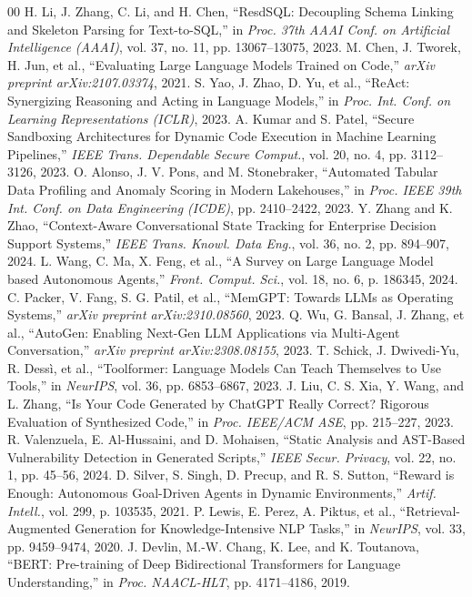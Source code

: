 \documentclass[conference]{IEEEtran}
\begin{document}
\begin{thebibliography}{00}
 H. Li, J. Zhang, C. Li, and H. Chen, ``ResdSQL: Decoupling Schema Linking and Skeleton Parsing for Text-to-SQL,'' in \textit{Proc. 37th AAAI Conf. on Artificial Intelligence (AAAI)}, vol. 37, no. 11, pp. 13067--13075, 2023.
 M. Chen, J. Tworek, H. Jun, et al., ``Evaluating Large Language Models Trained on Code,'' \textit{arXiv preprint arXiv:2107.03374}, 2021.
 S. Yao, J. Zhao, D. Yu, et al., ``ReAct: Synergizing Reasoning and Acting in Language Models,'' in \textit{Proc. Int. Conf. on Learning Representations (ICLR)}, 2023.
 A. Kumar and S. Patel, ``Secure Sandboxing Architectures for Dynamic Code Execution in Machine Learning Pipelines,'' \textit{IEEE Trans. Dependable Secure Comput.}, vol. 20, no. 4, pp. 3112--3126, 2023.
 O. Alonso, J. V. Pons, and M. Stonebraker, ``Automated Tabular Data Profiling and Anomaly Scoring in Modern Lakehouses,'' in \textit{Proc. IEEE 39th Int. Conf. on Data Engineering (ICDE)}, pp. 2410--2422, 2023.
 Y. Zhang and K. Zhao, ``Context-Aware Conversational State Tracking for Enterprise Decision Support Systems,'' \textit{IEEE Trans. Knowl. Data Eng.}, vol. 36, no. 2, pp. 894--907, 2024.
 L. Wang, C. Ma, X. Feng, et al., ``A Survey on Large Language Model based Autonomous Agents,'' \textit{Front. Comput. Sci.}, vol. 18, no. 6, p. 186345, 2024.
 C. Packer, V. Fang, S. G. Patil, et al., ``MemGPT: Towards LLMs as Operating Systems,'' \textit{arXiv preprint arXiv:2310.08560}, 2023.
 Q. Wu, G. Bansal, J. Zhang, et al., ``AutoGen: Enabling Next-Gen LLM Applications via Multi-Agent Conversation,'' \textit{arXiv preprint arXiv:2308.08155}, 2023.
 T. Schick, J. Dwivedi-Yu, R. Dessì, et al., ``Toolformer: Language Models Can Teach Themselves to Use Tools,'' in \textit{NeurIPS}, vol. 36, pp. 6853--6867, 2023.
 J. Liu, C. S. Xia, Y. Wang, and L. Zhang, ``Is Your Code Generated by ChatGPT Really Correct? Rigorous Evaluation of Synthesized Code,'' in \textit{Proc. IEEE/ACM ASE}, pp. 215--227, 2023.
 R. Valenzuela, E. Al-Hussaini, and D. Mohaisen, ``Static Analysis and AST-Based Vulnerability Detection in Generated Scripts,'' \textit{IEEE Secur. Privacy}, vol. 22, no. 1, pp. 45--56, 2024.
 D. Silver, S. Singh, D. Precup, and R. S. Sutton, ``Reward is Enough: Autonomous Goal-Driven Agents in Dynamic Environments,'' \textit{Artif. Intell.}, vol. 299, p. 103535, 2021.
 P. Lewis, E. Perez, A. Piktus, et al., ``Retrieval-Augmented Generation for Knowledge-Intensive NLP Tasks,'' in \textit{NeurIPS}, vol. 33, pp. 9459--9474, 2020.
 J. Devlin, M.-W. Chang, K. Lee, and K. Toutanova, ``BERT: Pre-training of Deep Bidirectional Transformers for Language Understanding,'' in \textit{Proc. NAACL-HLT}, pp. 4171--4186, 2019.
\end{thebibliography}
\end{document}
